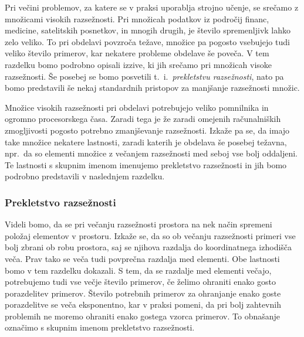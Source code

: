 \documentclass[12pt,a4paper,twoside]{article}
\theoremstyle{definition} %
\theoremstyle{plain} %
\numberwithin{equation}{section}  %
\begin{document}
Pri večini problemov, za katere se v praksi uporablja strojno učenje, se srečamo z množicami visokih razsežnosti. 
Pri množicah podatkov iz področij financ, medicine, satelitskih posnetkov, in mnogih drugih, je število spremenljivk lahko zelo veliko. 
To pri obdelavi povzroča težave, množice pa pogosto vsebujejo tudi veliko število primerov, kar nekatere probleme obdelave še poveča. %
V tem razdelku bomo podrobno opisali izzive, ki jih srečamo pri množicah visoke razsežnosti. 
Še posebej se bomo posvetili t.~i.~\emph{prekletstvu razsežnosti}, nato pa bomo predstavili še nekaj standardnih pristopov za manjšanje razsežnosti množic.

Množice visokih razsežnosti pri obdelavi potrebujejo veliko pomnilnika in ogromno procesorskega časa. 
Zaradi tega je že zaradi omejenih računalniških zmogljivosti pogosto potrebno zmanjševanje razsežnosti. 
Izkaže pa se, da imajo take množice nekatere lastnosti, zaradi katerih je obdelava še posebej težavna, 
npr.\ da so elementi množice z večanjem razsežnosti med seboj vse bolj oddaljeni. 
Te lastnosti s skupnim imenom imenujemo prekletstvo razsežnosti in jih bomo podrobno predstavili v naslednjem razdelku.



\subsubsection{Prekletstvo razsežnosti}

Videli bomo, da se pri večanju razsežnosti prostora na nek način spremeni položaj elementov v prostoru. 
Izkaže se, da so ob večanju razsežnosti primeri vse bolj zbrani ob robu prostora, saj se njihova razdalja do koordinatnega izhodišča veča. 
Prav tako se veča tudi povprečna razdalja med elementi. Obe lastnosti bomo v tem razdelku dokazali. 
S tem, da se razdalje med elementi večajo, potrebujemo tudi vse večje število primerov, če želimo ohraniti enako gosto porazdelitev primerov. 
Število potrebnih primerov za ohranjanje enako goste porazdelitve se veča eksponentno, kar v praksi pomeni, da pri bolj zahtevnih problemih ne moremo ohraniti enako gostega vzorca primerov. 
To obnašanje označimo s skupnim imenom prekletstvo razsežnosti.
\end{document}
